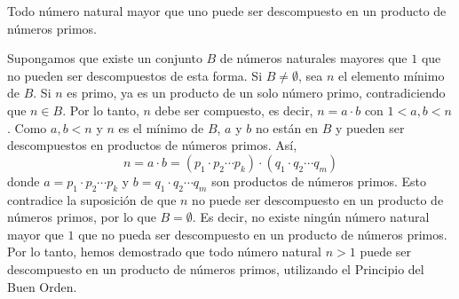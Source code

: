 \begin{examplebox}{}{}
    Todo número natural mayor que uno puede ser descompuesto en un producto de números primos.

    \tcblower
    \demostracion Supongamos que existe un conjunto $B$ de números naturales mayores que $1$ que no pueden ser descompuestos de esta forma. Si $B \neq \emptyset$, sea $n$ el elemento mínimo de $B$. Si $n$ es primo, ya es un producto de un solo número primo, contradiciendo que $n \in B$. Por lo tanto, $n$ debe ser compuesto, es decir, $n = a \cdot b$ con $1 < a, b < n$. Como $a, b < n$ y $n$ es el mínimo de $B$, $a$ y $b$ no están en $B$ y pueden ser descompuestos en productos de números primos. Así,
    $$n = a \cdot b = (p_1 \cdot p_2 \cdots p_k) \cdot (q_1 \cdot q_2 \cdots q_m)$$
    donde $a = p_1 \cdot p_2 \cdots p_k$ y $b = q_1 \cdot q_2 \cdots q_m$ son productos de números primos. Esto contradice la suposición de que $n$ no puede ser descompuesto en un producto de números primos, por lo que $B = \emptyset$. Es decir, no existe ningún número natural mayor que $1$ que no pueda ser descompuesto en un producto de números primos. Por lo tanto, hemos demostrado que todo número natural $n > 1$ puede ser descompuesto en un producto de números primos, utilizando el Principio del Buen Orden.
\end{examplebox}

